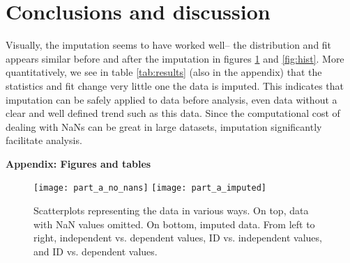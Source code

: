 \documentclass[12pt, letterpaper]{article}
\begin{document}
\section*{Conclusions and discussion}
Visually, the imputation seems to have worked well-- the distribution and fit appears similar before and after the imputation in figures \ref{fig:replacement} and \ref{fig:hist}.
More quantitatively, we see in table \ref{tab:results} (also in the appendix) that the statistics and fit change very little one the data is imputed.
This indicates that imputation can be safely applied to data before analysis, even data without a clear and well defined trend such as this data.
Since the computational cost of dealing with NaNs can be great in large datasets, imputation significantly facilitate analysis.

\newpage
\textbf{Appendix: Figures and tables}

\begin{figure}[H]
    \centering
    \texttt{[image: part\_a\_no\_nans]}
    \texttt{[image: part\_a\_imputed]}
    \caption{
        Scatterplots representing the data in various ways.
        On top, data with NaN values omitted.
        On bottom, imputed data.
        From left to right, independent vs. dependent values, ID vs. independent values, and ID vs. dependent values.
    }
    \label{fig:replacement}
\end{figure}
\end{document}
